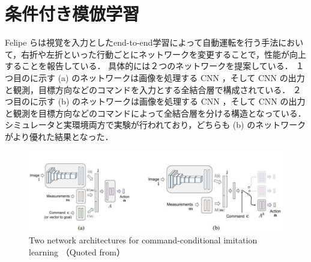 \section{条件付き模倣学習}
Felipe ら\cite{codevilla2018endtoend}は視覚を入力としたend-to-end学習によって自動運転を行う手法において，右折や左折といった行動ごとにネットワークを変更することで，性能が向上することを報告している．
具体的には２つのネットワークを提案している．
１つ目のに示す (a) のネットワークは画像を処理する CNN ，そして CNN の出力と観測，目標方向などのコマンドを入力とする全結合層で構成されている．
２つ目のに示す (b) のネットワークは画像を処理する CNN ，そして CNN の出力と観測を目標方向などのコマンドによって全結合層を分ける構造となっている．
シミュレータと実環境両方で実験が行われており，どちらも (b) のネットワークがより優れた結果となった．

\begin{figure}[htbp]
  \centering
  \includegraphics[width=140mm]{images/pdf/other/branched.pdf}
  \caption[Two network architectures for command-conditional imitation learning]{Two network architectures for command-conditional imitation learning 
  \protect\linebreak （Quoted from\cite{codevilla2018endtoend}）}
  \label{fig:felipe_branched}
\end{figure}

\clearpage